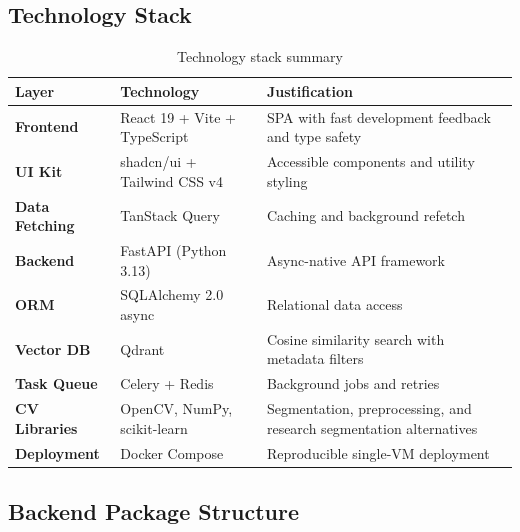 \subsection{Technology Stack}\label{technology-stack}

\begin{table}[H]
\centering
\caption{Technology stack summary}
\begin{tabularx}{\textwidth}{@{}p{3cm}p{4.2cm}X@{}}
\toprule
\textbf{Layer} & \textbf{Technology} & \textbf{Justification} \\
\midrule
\textbf{Frontend} & React 19 + Vite + TypeScript~\cite{react,vite} & SPA with fast development feedback and type safety \\
\textbf{UI Kit} & shadcn/ui + Tailwind CSS v4 & Accessible components and utility styling \\
\textbf{Data Fetching} & TanStack Query & Caching and background refetch \\
\textbf{Backend} & FastAPI (Python 3.13)~\cite{fastapi,python2024} & Async-native API framework \\
\textbf{ORM} & SQLAlchemy 2.0 async & Relational data access \\
\textbf{Vector DB} & Qdrant~\cite{qdrant} & Cosine similarity search with metadata filters \\
\textbf{Task Queue} & Celery + Redis & Background jobs and retries \\
\textbf{CV Libraries} & OpenCV, NumPy, scikit-learn~\cite{bradski2000opencv,harris2020array,pedregosa2011scikit} & Segmentation, preprocessing, and research segmentation alternatives \\
\textbf{Deployment} & Docker Compose~\cite{merkel2014docker} & Reproducible single-VM deployment \\
\bottomrule
\end{tabularx}
\end{table}

\subsection{Backend Package Structure}\label{backend-package-structure}

